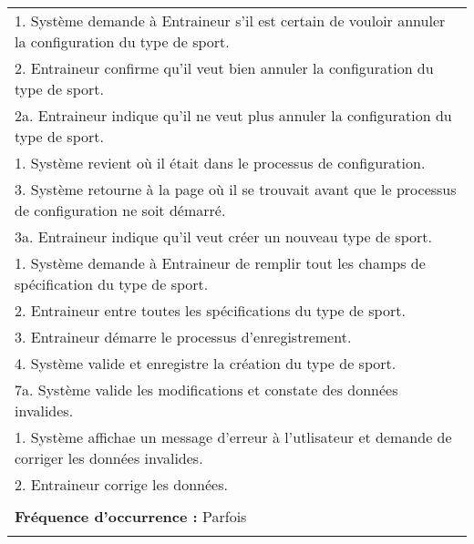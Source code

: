 \begin{longtable}{|p{16cm}|}
	\hspace{1cm}1. Système demande à Entraineur s'il est certain de vouloir annuler la configuration du type de sport.\\
	\hspace{1cm}2. Entraineur confirme qu'il veut bien annuler la configuration du type de sport.\\
	\hspace{2cm}2a. Entraineur indique qu'il ne veut plus annuler la configuration du type de sport.\\
	\hspace{3cm}1. Système revient où il était dans le processus de configuration.\\
	\hspace{1cm}3. Système retourne à la page où il se trouvait avant que le processus de configuration ne soit démarré.\\
	3a. Entraineur indique qu'il veut créer un nouveau type de sport.\\
	\hspace{1cm}1. Système demande à Entraineur de remplir tout les champs de spécification du type de sport.\\
	\hspace{1cm}2. Entraineur entre toutes les spécifications du type de sport.\\
	\hspace{1cm}3. Entraineur démarre le processus d'enregistrement.\\
	\hspace{1cm}4. Système valide et enregistre la création du type de sport.\\
	7a. Système valide les modifications et constate des données invalides.\\
	\hspace{1cm}1. Système affichae un message d'erreur à l'utlisateur et demande de corriger les données invalides.\\
	\hspace{1cm}2. Entraineur corrige les données.\\
	\\
	\textbf{Fréquence d'occurrence :} Parfois\\
	\\
	\hline
\end{longtable}



